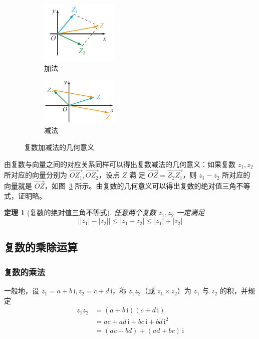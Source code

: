 \documentclass[a4paper,openany]{ctexbook}
\newtheorem{thmlevel1}{定理}
\renewcommand{\vec}{\overrightarrow}
\newcommand{\ii}{\,\mathrm{i}}
\begin{document}
\begin{figure}
    \centering
    \begin{subfigure}{10em}
        \includegraphics[width=10em]{image4.png}
        \caption{加法}\label{fgr:fuuujxfa}
    \end{subfigure}
    \qquad
    \begin{subfigure}{10em}
        \includegraphics[width=10em]{image5.png}
        \caption{减法}\label{fgr:fuuujmfa}
    \end{subfigure}
    \caption{复数加减法的几何意义}
\end{figure}

由复数与向量之间的对应关系同样可以得出复数减法的几何意义：如果复数 \(z_1,z_2\) 所对应的向量分别为 \(\vec{OZ_1},\vec{OZ_2}\)，设点 \(Z\) 满
足 \(\vec{OZ}=\vec{Z_2Z_1}\)，则 \(z_1-z_2\) 所对应的向量就是 \(\vec{OZ}\)，如图~\ref{fgr:fuuujmfa} 所示。由复数的几何意义可以得出复数的绝对值三角不等式，证明略。

\begin{thmlevel1}[复数的绝对值三角不等式]
    任意两个复数 \(z_1,z_2\) 一定满足
    \[
        \big||z_1|-|z_2|\big|\le |z_1-z_2| \le |z_1|+|z_2|
    \]
\end{thmlevel1}

\subsection{复数的乘除运算}

\subsubsection{复数的乘法}

一般地，设 \(z_1=a+b\ii,z_2=c+d\ii\)，称 \(z_1z_2\)（或 \(z_1\times z_2\)）为 \(z_1\) 与 \(z_2\) 的积，并规定
\begin{align*}
    z_1z_2 & = (a+b\ii)(c+d\ii)       \\
           & = ac+ad\ii+bc\ii+bd\ii^2 \\
           & =(ac-bd)+(ad+bc)\ii
\end{align*}
\end{document}
